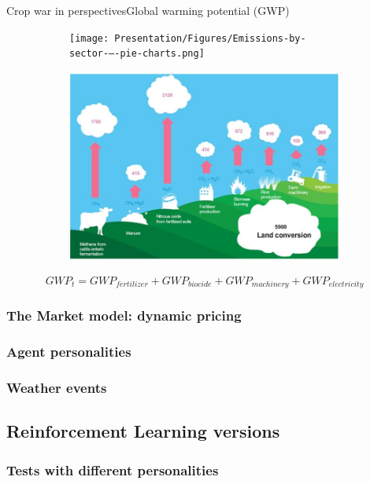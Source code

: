 \documentclass[10pt, aspectratio=169]{beamer}
\def\aac{The Market model: dynamic pricing}
\def\aad{Agent personalities}
\def\aae{Weather events}
\def\ab{Reinforcement Learning versions}
\def\abb{Tests with different personalities}
\begin{document}
\begin{frame}{Crop war in perspectives}{Global warming potential (GWP)}{}

\begin{figure}
   \hfill
        \newline 
     \centering
     \begin{subfigure}[b]{0.40\textwidth}

         \centering
         \texttt{[image: Presentation/Figures/Emissions-by-sector-–-pie-charts.png]}
     \end{subfigure}
 \hfill
     \begin{subfigure}[b]{0.50\textwidth}
         \centering
         \includegraphics[width=\linewidth]{Presentation/Figures/GHG-emissions-from-agricultural-sector-by-practices-in-Mt-CO2-e.png}
     \end{subfigure}
     \hfill
     
    \begin{equation}
    GWP_{t}=GWP_{fertilizer}+GWP_{biocide}+GWP_{machinery}+GWP_{electricity}  
    \end{equation}

\end{figure}
 

\end{frame}

\subsubsection{\aac}
\subsubsection{\aad}
\subsubsection{\aae}

\subsection{\ab}


\subsubsection{\abb}
\end{document}
